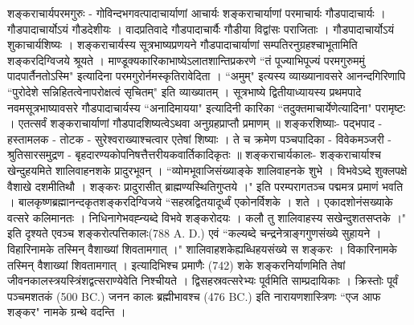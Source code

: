 शङ्कराचार्यपरमगुरुः -
गोविन्दभगवत्पादाचार्याणां आचार्यः शङ्कराचार्याणां परमाचार्यः गौडपादाचार्यः । गौडपादाचार्योऽयं गौडदेशीयः । वादप्रतिवादे गौडपादाचार्यैः गौडीया विद्वांसः पराजिताः । गौडपादाचार्योऽयं शुकाचार्यशिष्यः । शङ्कराचार्यस्य सूत्रभाष्यप्रणयने गौडपादाचार्याणां सम्पतिरनुग्रहश्चाभूतामिति शङ्करदिग्विजये श्रूयते । माण्डूक्यकारिकाभाष्येऽलातशान्तिप्रकरणे ``तं पूज्याभिपूज्यं परमगुरुममुं पादपार्तैनतोऽस्मि" इत्यादिना परमगुरोर्नमस्कृतिरावेदिता । ``अमुम्" इत्यस्य व्याख्यानावसरे आनन्दगिरिणापि ``पुरोदेशे सन्निहितत्वेनापरोक्षत्वं सृचितम्" इति व्याख्यातम् । सूत्रभाष्ये द्वितीयाध्यायस्य प्रथमपादे नवमसूत्रभाष्यावसरे गौडपादाचार्यस्य ``अनादिमायया" इत्यादिनी कारिका ``तदुक्तमाचार्येणेत्यादिना" परामृष्टः । एतत्सर्वं शङ्कराचार्याणां गौडपादशिष्यत्वेऽथवा अनुग्रहप्राप्तौ प्रमाणम् ॥
शङ्करशिष्याः-
पद्भपाद - हस्तामलक - तोटक - सुरेश्वराख्याश्चत्वार एतेषां शिष्याः । ते च क्रमेण पञ्चपादिका - विवेकमञ्जरी - श्रुतिसारसमुद्रण - बृहदारण्यकोपनिषत्तैत्तरीयकवार्तिकादिकृतः ॥
शङ्कराचार्यकालः- 
शङ्कराचार्याश्च खेन्दुहयमिते शालिवाहनशके प्रादुरभूवन् । ``व्योमभूवाजिसंख्याङ्के शालिवाहनके शुभे । विभवेऽब्दे शुक्लपक्षे वैशाखे दशमीतिथौ । शङ्करः प्रादुरासीत् ब्राह्मण्यस्थितिगुप्तये ।" इति परम्परागतञ्च पद्ममत्र प्रमाणं भवति । बालकृष्णब्रह्मानन्दकृतशङ्करदिग्विजये ``सहस्रद्वितयादूर्ध्वं एकोनर्विशके । शते । एकादशोनंसख्याके वत्सरे कलिमानतः । निधिनागेभवह्न्यब्दे विभवे शङ्करोदयः । कलौ तु शालिवाहस्य सखेन्दुशतसप्तके ।" इति दृश्यते एवञ्च शङ्करोत्पत्तिकालः(788 A. D.) एवं ``कल्यब्दे चन्द्रनेत्राङ्गगुणसंख्ये सुहायने । विहारिनामके तस्मिन् वैशाख्यां शिवतामगात् ।" शालिवाहशकेह्यब्धिहयसंख्ये स शङ्करः । विकारिनामके तस्मिन् वैशाख्यां शिवतामगात् । इत्यादिभिश्च प्रमाणैः (742) शके शङ्करनिर्याणमिति तेषां जीवनकालस्त्रयस्त्रिंशद्वत्सराण्येवेति निश्चीयते । द्विसहस्रवत्सरेभ्यः पूर्वमिति साम्प्रदायिकाः । क्रिस्तोः पूर्वं पञ्चमशतकं (500 BC.) जनन कालः ब्रह्मीभावश्च (476 BC.) इति नारायणशास्त्रिणः ``एज आफ शङ्कर" नामके ग्रन्थे वदन्ति ।
